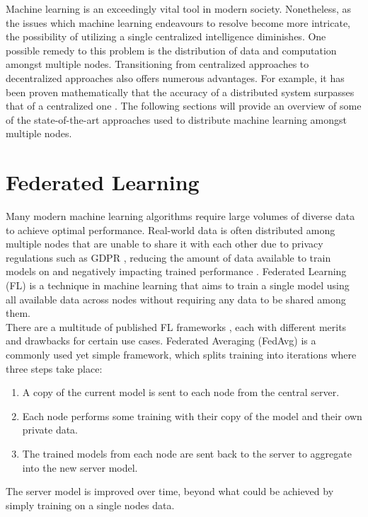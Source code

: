 Machine learning is an exceedingly vital tool in modern society. Nonetheless, as the issues which machine learning endeavours to resolve become more intricate, the possibility of utilizing a single centralized intelligence diminishes. One possible remedy to this problem is the distribution of data and computation amongst multiple nodes. Transitioning from centralized approaches to decentralized approaches also offers numerous advantages. For example, it has been proven mathematically that the accuracy of a distributed system surpasses that of a centralized one \cite{swarmbetterthanone}. The following sections will provide an overview of some of the state-of-the-art approaches used to distribute machine learning amongst multiple nodes.

\section{Federated Learning}
Many modern machine learning algorithms require large volumes of diverse data to achieve optimal performance. Real-world data is often distributed among multiple nodes that are unable to share it with each other due to privacy regulations such as GDPR \cite{gdpr}, reducing the amount of data available to train models on and negatively impacting trained performance \cite{data_volume}. Federated Learning (FL) \cite{survey_on_fed_learning} is a technique in machine learning that aims to train a single model using all available data across nodes without requiring any data to be shared among them. \\

There are a multitude of published FL frameworks \cite{fed_table_survey}, each with different merits and drawbacks for certain use cases. Federated Averaging (FedAvg) \cite{fed_learning} is a commonly used yet simple framework, which splits training into iterations where three steps take place:
\begin{enumerate}
	\item A copy of the current model is sent to each node from the central server.
	\item Each node performs some training with their copy of the model and their own private data.
	\item The trained models from each node are sent back to the server to aggregate into the new server model.
\end{enumerate}
The server model is improved over time, beyond what could be achieved by simply training on a single nodes data. \\

